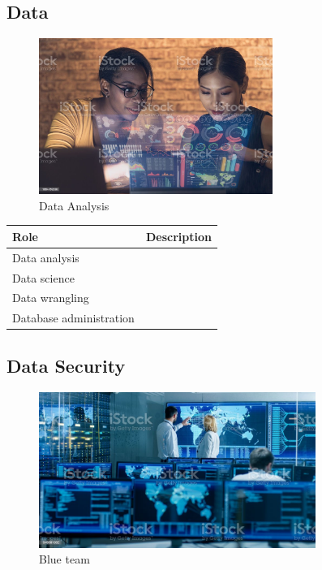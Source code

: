 \subsection{Data}

\begin{figure}[H]
	\begin{center}
		\caption{Data Analysis}
		\vskip 4pt
		\includegraphics[height=2in]{images/careers/istockphoto-1364769258-1024x1024.jpg}
	\end{center}
\end{figure}

\begin{table}[H]
	\begin{center}
		\begin{tabular}{p{1.3in}|p{3in}} 
			\textbf{Role} & \textbf{Description}\\
			\hline
			Data analysis & \\
			\hline
			Data science & \\
			\hline
			Data wrangling & \\
			\hline
			Database administration & \\
		\end{tabular}
	\end{center}
\end{table}

\subsection{Data Security}

\begin{figure}[H]
	\begin{center}
		\caption{Blue team}
		\vskip 4pt
		\includegraphics[height=2in]{images/careers/istockphoto-949581032-1024x1024.jpg}
	\end{center}
\end{figure}

